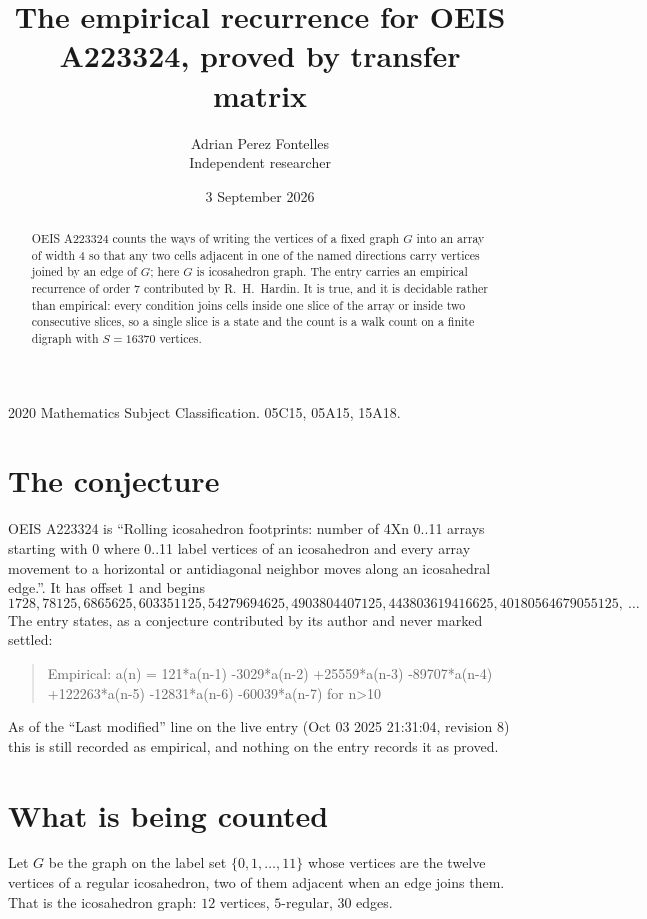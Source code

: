\documentclass[11pt,a4paper]{article}
\title{The empirical recurrence for OEIS A223324, proved by transfer matrix}
\author{Adrian Perez Fontelles\\ \small Independent researcher}
\date{3 September 2026}
\theoremstyle{plain}
\theoremstyle{definition}
\begin{document}
\maketitle

\begin{abstract}
OEIS A223324 counts the ways of writing the vertices of a fixed graph $G$ into an array of width
$4$ so that any two cells adjacent in one of the named directions carry vertices joined by an
edge of $G$; here $G$ is icosahedron graph. The entry carries an empirical recurrence of order $7$
contributed by R.~H.~Hardin. It is true, and it is decidable rather than empirical: every
condition joins cells inside one slice of the array or inside two consecutive slices, so a
single slice is a state and the count is a walk count on a finite digraph with $S=16370$ vertices.
\end{abstract}

\noindent\small 2020 Mathematics Subject Classification. 05C15, 05A15, 15A18.\normalsize

\section{The conjecture}

OEIS A223324 is ``Rolling icosahedron footprints: number of 4Xn 0..11 arrays starting with 0 where 0..11 label vertices of an icosahedron and every array movement to a horizontal or antidiagonal neighbor moves along an icosahedral edge.''. It has offset $1$ and begins
\[
1728, 78125, 6865625, 603351125, 54279694625, 4903804407125, 443803619416625, 40180564679055125,\ \dots
\]
The entry states, as a conjecture contributed by its author and never marked settled:
\begin{quote}
Empirical: a(n) = 121*a(n-1) -3029*a(n-2) +25559*a(n-3) -89707*a(n-4) +122263*a(n-5) -12831*a(n-6) -60039*a(n-7) for n>10
\end{quote}
As of the ``Last modified'' line on the live entry (Oct 03 2025 21:31:04, revision 8) this is still
recorded as empirical, and nothing on the entry records it as proved.

\section{What is being counted}

Let $G$ be the graph on the label set $\{0,1,\dots,11\}$ whose vertices are the twelve vertices of a regular icosahedron, two of them adjacent when an edge joins them. That is the icosahedron graph: $12$ vertices, $5$-regular, $30$ edges.
\end{document}
